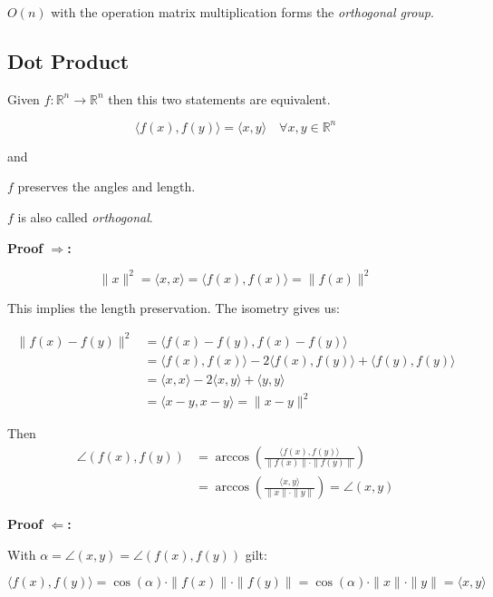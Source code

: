 \(O(n)\) with the operation matrix multiplication forms the \emph{orthogonal group}.
\vspace{\baselineskip}

\subsection{Dot Product}

Given \(f: \mathbb{R}^n \to \mathbb{R}^n\) then this two statements are equivalent.

\[
\langle f(x), f(y) \rangle = \langle x, y \rangle \quad \forall x,y \in \mathbb{R}^n
\]

and 
\vspace{\baselineskip}

\(f\) preserves the angles and length.
\vspace{\baselineskip}

\(f\) is also called \emph{orthogonal}.
\vspace{\baselineskip}

\textbf{Proof \(\Rightarrow\):}
 
\[
\|x\|^2 = \langle x, x \rangle = \langle f(x), f(x) \rangle = \|f(x)\|^2
\]

This implies the length preservation. The isometry gives us:

\begin{align*}
\|f(x) - f(y)\|^2 
&= \langle f(x) - f(y), f(x) - f(y) \rangle \\
&= \langle f(x), f(x) \rangle - 2\langle f(x), f(y) \rangle + \langle f(y), f(y) \rangle \\
&= \langle x, x \rangle - 2\langle x, y \rangle + \langle y, y \rangle \\
&= \langle x - y, x - y \rangle = \|x - y\|^2
\end{align*}

Then 
\begin{align*}
\angle(f(x), f(y)) 
&= \arccos\left( \frac{\langle f(x), f(y) \rangle}{\|f(x)\| \cdot \|f(y)\|} \right) \\
&= \arccos\left( \frac{\langle x, y \rangle}{\|x\| \cdot \|y\|} \right) 
= \angle(x, y)
\end{align*}

\QED
\vspace{\baselineskip}

\textbf{Proof \(\Leftarrow\):} 

With \(\alpha = \angle(x, y) = \angle(f(x), f(y))\) gilt:

\[
\langle f(x), f(y) \rangle = \cos(\alpha) \cdot \|f(x)\| \cdot \|f(y)\| = \cos(\alpha) \cdot \|x\| \cdot \|y\| = \langle x, y \rangle
\]

